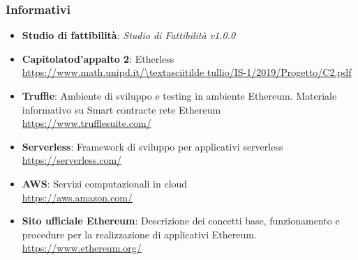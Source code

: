 \subsubsection{Informativi}
\begin{itemize}
	\item \textbf{Studio di fattibilità}: \textit{Studio di Fattibilità v1.0.0}
    \item \textbf{Capitolato\glo d'appalto 2}: Etherless\\ 
			\url{https://www.math.unipd.it/\textasciitilde tullio/IS-1/2019/Progetto/C2.pdf}
	\item \textbf{Truffle}:  Ambiente di sviluppo e testing in ambiente Ethereum\glo. Materiale informativo su Smart contract\glo e rete Ethereum\glo
		\\ \url{https://www.trufflesuite.com/}
	\item \textbf{Serverless}:  Framework di sviluppo per applicativi serverless		\\ \url{https://serverless.com/}
	\item \textbf{AWS}: Servizi computazionali in cloud \\ \url{https://aws.amazon.com/}
	\item \textbf{Sito ufficiale Ethereum\glo}: Descrizione dei concetti base, funzionamento e procedure per la realizzazione di applicativi Ethereum\glo.
\\ \url {https://www.ethereum.org/}
\end{itemize}

	
	
	